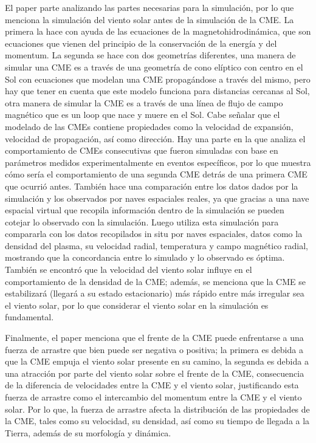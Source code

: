 El paper parte analizando las partes necesarias para la simulación, por lo que menciona la simulación del viento solar antes de la simulación de la CME. La primera la hace con ayuda de las ecuaciones de la magnetohidrodinámica, que son ecuaciones que vienen del principio de la conservación de la energía y del momentum. La segunda se hace con dos geometrías diferentes, una manera de simular una \ac{CME} es a través de una geometría de cono elíptico con centro en el Sol con ecuaciones que modelan una \ac{CME} propagándose a través del mismo, pero hay que tener en cuenta que este modelo funciona para distancias cercanas al Sol, otra manera de simular la \ac{CME} es a través de una línea de flujo de campo magnético que es un loop que nace y muere en el Sol. Cabe señalar que el modelado de las \acp{CME} contiene propiedades como la velocidad de expansión, velocidad de propagación, así como dirección.
Hay una parte en la que analiza el comportamiento de \acp{CME} consecutivas que fueron simuladas con base en parámetros medidos experimentalmente en eventos específicos, por lo que muestra cómo sería el comportamiento de una segunda \ac{CME} detrás de una primera \ac{CME} que ocurrió antes.
También hace una comparación entre los datos dados por la simulación y los observados por naves espaciales reales, ya que gracias a una nave espacial virtual que recopila información dentro de la simulación se pueden cotejar lo observado con la simulación. Luego utiliza esta simulación para compararla con los datos recopilados in situ por naves espaciales, datos como la densidad del plasma, su velocidad radial, temperatura y campo magnético radial, mostrando que la concordancia entre lo simulado y lo observado es óptima.
También se encontró que la velocidad del viento solar influye en el comportamiento de la densidad de la CME; además, se menciona que la \ac{CME} se estabilizará (llegará a su estado estacionario) más rápido entre más irregular sea el viento solar, por lo que considerar el viento solar en la simulación es fundamental.

Finalmente, el paper menciona que el frente de la \ac{CME} puede enfrentarse a una fuerza de arrastre que bien puede ser negativa o positiva; la primera es debida a que la \ac{CME} empuja el viento solar presente en su camino, la segunda es debida a una atracción por parte del viento solar sobre el frente de la CME, consecuencia de la diferencia de velocidades entre la \ac{CME} y el viento solar, justificando esta fuerza de arrastre como el intercambio del momentum entre la \ac{CME} y el viento solar. Por lo que, la fuerza de arrastre afecta la distribución de las propiedades de la CME, tales como su velocidad, su densidad, así como su tiempo de llegada a la Tierra, además de su morfología y dinámica.


